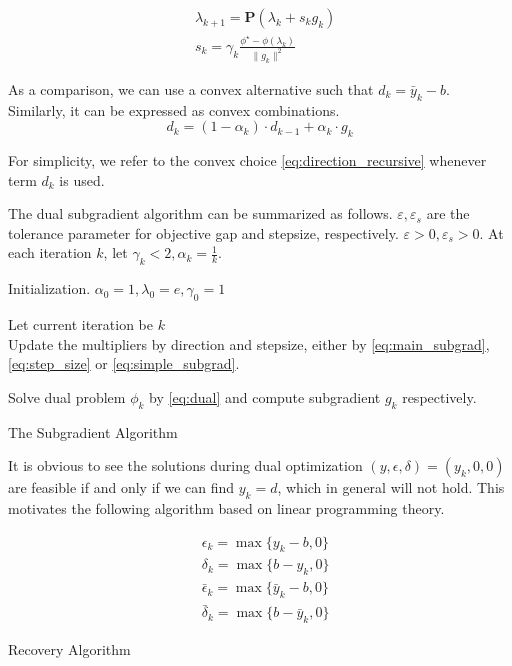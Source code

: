 \documentclass[../main]{subfiles}
\begin{document}
\begin{equation}\label{eq:simple_subgrad}
  \begin{aligned}
     & \lambda_{k+1} = \mathbf{P}(\lambda_{k} + s_{k}g_{k})             \\
     & s_{k} = \gamma_k\frac{\phi^\star - \phi(\lambda_k)}{\|g_{k}\|^2}
  \end{aligned}
\end{equation}

As a comparison, we can use a convex alternative such that \(d_k = \bar y_k - b\).
Similarly, it can be expressed as convex combinations.
\begin{equation}\label{eq:direction_recursive}
  d_k = (1-\alpha_k) \cdot d_{k-1} + \alpha_k\cdot g_k
\end{equation}

For simplicity, we refer to the convex choice \eqref{eq:direction_recursive} whenever term \(d_k\) is used.

The dual subgradient algorithm can be summarized as follows.
\(\varepsilon,\varepsilon_s\) are the tolerance parameter for objective gap and stepsize, respectively.
\(\varepsilon > 0 ,\varepsilon_s > 0\). At each iteration \(k\), let \(\gamma_k < 2, \alpha_k = \frac{1}{k}\).

\begin{algorithm}[H]\label{alg:subgradient}
  \SetAlgoLined
  Initialization. \(\alpha_0 = 1, \lambda_0 = e, \gamma_0 = 1\)  \\
  {
    Let current iteration be \(k\)\\
    Update the multipliers by direction and stepsize, either by \eqref{eq:main_subgrad}, \eqref{eq:step_size} or \eqref{eq:simple_subgrad}.

    Solve dual problem \(\phi_k\) by \eqref{eq:dual}
    and compute subgradient \(g_k\) respectively.
  }
  \caption{The Subgradient Algorithm}
\end{algorithm}

It is obvious to see the solutions during dual optimization
\((y, \epsilon, \delta) = (y_k, 0, 0)\) are feasible if and only if we
can find \(y_k = d\), which in general will not hold. This motivates the following
algorithm based on linear programming theory.

\begin{algorithm}[H]\label{alg:recovery}
  \SetAlgoLined
  \begin{equation}\label{eq:recovery}
    \begin{aligned}
       & \epsilon_k = \max\{y_k - b, 0\}           \\
       & \delta_k = \max\{b - y_k, 0\}             \\
       & \bar \epsilon_k = \max\{\bar y_k - b, 0\} \\
       & \bar \delta_k = \max\{b - \bar y_k, 0\}
    \end{aligned}\end{equation}
  \caption{Recovery Algorithm}
\end{algorithm}
\end{document}
